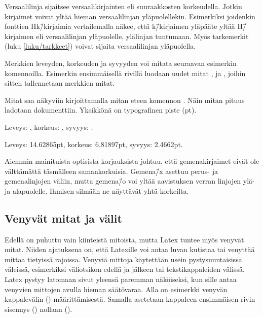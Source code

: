 Versaalilinja sijaitsee versaalikirjainten eli suuraakkosten
korkeudella. Jotkin kirjaimet voivat yltää hieman versaalilinjan
yläpuolellekin. Esimerkiksi joidenkin fonttien Hk\=/kirjaimia
vertailemalla näkee, että k\=/kirjaimen yläpääte yltää H\=/kirjaimen eli
versaalilinjan yläpuolelle, ylälinjan tuntumaan. Myös tarkemerkit (luku
\ref{luku/tarkkeet}) voivat sijaita versaalilinjan yläpuolella.

Merkkien leveyden, korkeuden ja syvyyden voi mitata seuraavan esimerkin
komennoilla. Esimerkin ensimmäisellä rivillä luodaan uudet mitat
,  ja , joihin sitten
tallennetaan merkkien mitat.

\begin{koodilohkosis}
\newlength{\leveys} \newlength{\korkeus} \newlength{\syvyys}
\settowidth{\leveys}{abc} %
\end{koodilohkosis}

\noindent
Mitat saa näkyviin kirjoittamalla mitan eteen komennon .
Näin mitan pituus ladotaan dokumenttiin. Yksikkönä on typografinen piste
(pt).

\begin{koodilohkosis}
Leveys: \the\leveys, korkeus: \the\korkeus, syvyys: \the\syvyys.
\end{koodilohkosis}

\begin{tulossis}
  Leveys: 14.62865pt, korkeus: 6.81897pt, syvyys: 2.4662pt.
\end{tulossis}

\noindent
Aiemmin mainituista optisista korjauksista johtuu, että gemenakirjaimet
eivät ole välttämättä täsmälleen samankorkuisia. Gemena\=/x asettuu
perus- ja gemenalinjojen väliin, mutta gemena\=/o voi yltää aavistuksen
verran linjojen ylä- ja alapuolelle. Ihmisen silmään ne näyttävät yhtä
korkeilta.

\subsection{Venyvät mitat ja välit}
\label{luku/venyvät-mitat}

Edellä on puhuttu vain kiinteistä mitoista, mutta Latex tuntee myös
venyvät mitat. Niiden ajatuksena on, että Latexille voi antaa luvan
kutistaa tai venyttää mittaa tietyissä rajoissa. Venyviä mittoja
käytettään usein pystysuuntaisissa väleissä, esimerkiksi väliotsikon
edellä ja jälkeen tai tekstikappaleiden välissä. Latex pystyy latomaan
sivut yleensä paremman näköiseksi, kun sille antaa venyvien mittojen
avulla hieman säätövaraa. Alla on esimerkki venyvän kappalevälin
() määrittämisestä. Samalla asetetaan kappaleen
ensimmäisen rivin sisennys () nollaan (\koodi{0em}).

